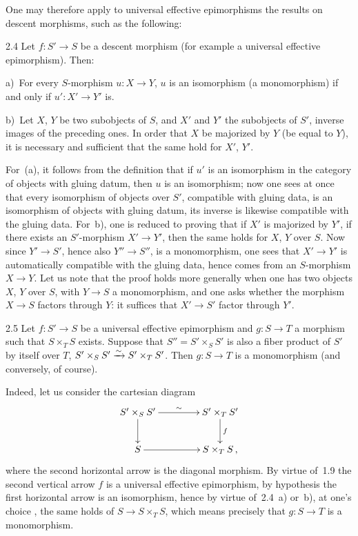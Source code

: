 One may therefore apply to universal effective epimorphisms the results on
descent morphisms, such as the following:

\begin{proposition}{2.4}
\label{IV.2.4}
Let \(f\colon S'\to S\) be a descent morphism (for example a universal
effective epimorphism). Then:

a)~For every \(S\)-morphism \(u\colon X\to Y\), \(u\) is an isomorphism
(\resp a monomorphism) if and only if \(u'\colon X'\to Y'\) is.

b)~Let \(X\), \(Y\) be two subobjects of \(S\), and \(X'\) and \(Y'\) the
subobjects of \(S'\), inverse images of the preceding ones. In order that
\(X\) be majorized by \(Y\) (\resp be equal to \(Y\)), it is necessary and
sufficient that the same hold for \(X'\), \(Y'\).
\end{proposition}

For~(a), it follows from the definition that if \(u'\) is an isomorphism in
the category of objects with gluing datum, then \(u\) is an isomorphism; now
one sees at once that every isomorphism of objects over \(S'\), compatible
with gluing data, is an isomorphism of objects with gluing datum,
\ie its inverse is likewise compatible with the gluing data. For~b), one is
reduced to proving that if \(X'\) is majorized by \(Y'\), \ie if there
exists an \(S'\)-morphism \(X'\to Y'\), then the same holds for \(X\), \(Y\)
over \(S\). Now since \(Y'\to S'\), hence also \(Y''\to S''\), is a
monomorphism, one sees that \(X'\to Y'\) is automatically compatible with
the gluing data, hence comes from an \(S\)-morphism \(X\to Y\). Let us note
that the proof holds more generally when one has two objects \(X\), \(Y\)
over \(S\), with \(Y\to S\) a monomorphism, and one asks whether the morphism
\(X\to S\) factors through \(Y\): it suffices that \(X'\to S'\) factor
through \(Y'\).

\begin{corollary}{2.5}
\label{IV.2.5}
Let \(f\colon S'\to S\) be a universal effective epimorphism and
\(g\colon S\to T\) a morphism such that \(S\times_{T}S\) exists. Suppose that
\(S''=S'\times_{S}S'\) is also a fiber product of \(S'\) by itself over \(T\),
\ie \(S'\times_{S}S'\xrightarrow{\sim} S'\times_{T}S'\). Then \(g\colon S\to T\) is a
monomorphism (and conversely, of course).
\end{corollary}

Indeed, let us consider the cartesian diagram
\[
\xymatrix@C=4.2em@R=2.4em{
S'\times_{S}S' \ar[r]^{\sim} \ar[d]
  & S'\times_{T}S' \ar[d]^{f} \\
S \ar[r]
  & S\times_{T}S\,,
}
\]
where the second horizontal arrow is the diagonal morphism. By virtue
of~1.9 the second vertical arrow \(f\) is a universal effective
epimorphism, by hypothesis the first horizontal arrow is an isomorphism,
hence by virtue of~2.4~a) or~b), at one's
choice%
{\renewcommand{\thefootnote}{(9)}},
the same holds of \(S\to S\times_{T}S\), which means precisely that
\(g\colon S\to T\) is a monomorphism.

